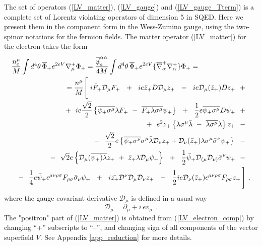 \documentclass[paper,12pt]{revtex4}
\newcommand{\slashed}[1]{\hbox{{$#1$}\llap{$/$}}}
\begin{document}
	The set of operators (\ref{LV_matter}), (\ref{LV_gauge}) and
	(\ref{LV_gauge_Tterm}) is a complete set of Lorentz violating
	operators of dimension 5 in SQED.
	Here we present them in the component form in the Wess-Zumino
	gauge, using the two-spinor notations for the fermion fields.
	The matter operator (\ref{LV_matter}) for the electron
	takes the form
\begin{eqnarray}
\nonumber
\lefteqn{
   \frac{n_e^\mu}
        {M} \int d^4\theta\, \overline{\Phi}_+ e^{2eV} 
		\nabla_\mu^+ \Phi_+ = 
   \frac{\overline{\slashed{n}}_e^{\dot{\alpha}\alpha}}
	{4 M} \int d^4\theta\, \overline{\Phi}_+ e^{2eV} 
	\{ \overline{\nabla}_{\dot{\alpha}}^+ \nabla_\alpha^+ \} \Phi_+ = 
	}\\
\nonumber
&&
 = \frac{n^\mu}{M} \Bigg [~
    i \bar{F}_+ \mathcal{D}_\mu F_+ ~~+~~
    i e \bar{z}_+ D \mathcal{D}_\mu z_+ ~~-~~
    i e \mathcal{D}_\mu(\bar{z}_+) D z_+ ~~+~~ \\
\label{LV_electron_comp}
&&
  + ~~ 
    i e \frac{\sqrt{2}}{2} \left\{
               \overline{\psi_+\sigma^\mu}\lambda F_+ 
	       ~-~
               \overline{F_+\lambda\sigma^\mu} \psi_+
                         \right\} ~~+~~ 
    \frac{1}{2} e \overline{\psi_+\sigma^\mu}D\psi_+ ~~+~~\\
\nonumber
&&
    +~~
    e^2 \bar{z}_+ \left\{
               \lambda\sigma^\mu\bar{\lambda} 
	       ~-~
               \overline{\lambda\sigma^\mu}\lambda 
                       \right\} z_+ 
  ~~-~~ \\
\nonumber
&&
    -~~ 
    \frac{\sqrt{2}}{2} e \left\{ 
                      \overline{\psi_+\sigma^\nu}\sigma^\mu 
                     \bar{\lambda}\mathcal{D}_\nu z_+ +
                     \mathcal{D}_\nu(\bar{z}_+)\lambda\sigma^\mu
                     \bar{\sigma}^\nu \psi_+
                     \right \}
 ~~-~~ \\
\nonumber
&&
 -~~
   \sqrt{2} e \left\{ 
                     \mathcal{D}_\mu(\overline{\psi_+)\lambda} z_+ 
		     ~+~ 
                     \bar{z}_+ \lambda \mathcal{D}_\mu \psi_+ 
                     \right\} 
 ~~+~~ 
  \frac{1}{2}\bar{\psi}_+\mathcal{D}_{(\mu}\mathcal{D}_{\nu)}
               \bar{\sigma}^\nu \psi_+ 
   ~~-~~ \\
\nonumber
&&
   -~~
  \frac{1}{4} e \bar{\psi}_+\epsilon^{\mu\nu\rho\sigma}
              F_{\rho\sigma} \bar{\sigma}_\nu \psi_+
   ~~+~~
  i \bar{z_+} \mathcal{D}^\nu \mathcal{D}_\mu \mathcal{D}_\nu z_+ 
   ~~+~~
   \frac{1}{2} i e \mathcal{D}_\nu (\bar{z}_+) \epsilon^{\mu\nu\rho\sigma}
              F_{\rho\sigma} z_+ \, 
   \Bigg] ~,
\end{eqnarray}
        where the gauge covariant derivative $ \mathcal{D}_\mu $ is defined in a usual way 
$$ 
  \mathcal{D}_\mu = \partial_\mu + i\, e v_\mu~~.
$$
	The "positron" part of (\ref{LV_matter}) is obtained from
	(\ref{LV_electron_comp}) by changing ``+'' subscripts to
	``--'', and changing sign of all components of the vector
	superfield $ V $. See Appendix \ref{app_reduction} for
	more details.
\end{document}
